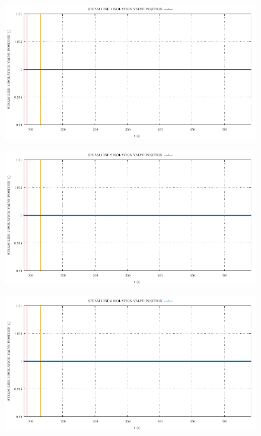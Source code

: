 \documentclass{article}
\begin{document}
\begin{multicols}{2}
\begin{figure}[H]
\end{figure}
\begin{figure}[H]
\centering
\includegraphics[width=\linewidth]{./graphs/STEAM LINE 1 ISOLATION VALVE POSITION_comp.pdf}
\end{figure}
\begin{figure}[H]
\centering
\includegraphics[width=\linewidth]{./graphs/STEAM LINE 2 ISOLATION VALVE POSITION_comp.pdf}
\end{figure}
\begin{figure}[H]
\centering
\includegraphics[width=\linewidth]{./graphs/STEAM LINE 3 ISOLATION VALVE POSITION_comp.pdf}

\end{figure}
\end{multicols}
\end{document}
